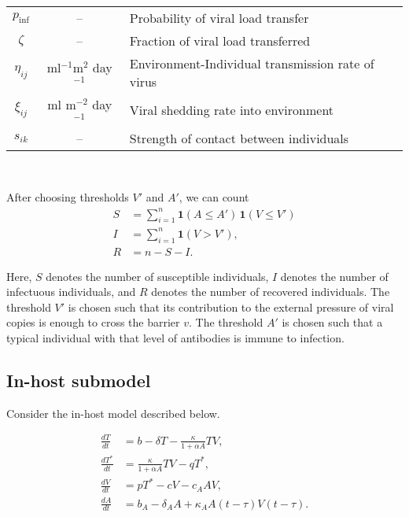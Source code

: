 \documentclass[11pt]{article}
\newcommand{\iv}{$^{-1}$}
\begin{document}
\begin{table}[h!]
\begin{tabular}{ccl}
            $p_\text{inf}$  & --
                                    & Probability of viral load transfer \\
            $\zeta$     & --
                                    & Fraction of viral load transferred \\
            $\eta_{ij}$ & ml\iv m$^2$ day\iv
                                    & Environment-Individual transmission rate of virus\\
            $\xi_{ij}$  & ml m$^{-2}$ day\iv
                                    & Viral shedding rate into environment \\
            $s_{ik}$    & --
                                    & Strength of contact between individuals \\
            \hline
        \end{tabular}
        \label{tab:parameter}
    \end{table}

    ~

    After choosing thresholds $V'$ and $A'$, we can count \begin{align}
        S &= \sum_{i = 1}^n \mathbf{1}(A \leq A')\, \mathbf{1}(V \leq V') \\
        I &= \sum_{i = 1}^n \mathbf{1}(V > V'), \\
        R &= n - S - I.
    \end{align}

    Here, $S$ denotes the number of susceptible individuals, $I$ denotes the
    number of infectuous individuals, and $R$ denotes the number of recovered
    individuals. The threshold $V'$ is chosen such that its contribution to
    the external pressure of viral copies is enough to cross the barrier $v$.
    The threshold $A'$ is chosen such that a typical individual with that
    level of antibodies is immune to infection.


    \subsection{In-host submodel}

    Consider the in-host model described below.

    \begin{align*}
        \frac{dT}{dt} &= b -  \delta T - \frac{\kappa}{1 + \alpha A} TV, \\
        \frac{dT^*}{dt} &= \frac{\kappa}{1 + \alpha A} TV - qT^*, \\
        \frac{dV}{dt} &= pT^* - cV - c_A AV, \\
        \frac{dA}{dt} &= b_A -  \delta_A A + \kappa_A A(t - \tau)V(t - \tau).
    \end{align*}
\end{document}
